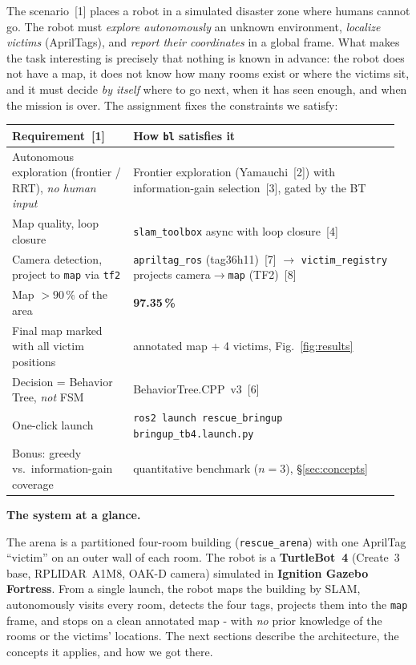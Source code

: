 \documentclass[11pt,a4paper]{article}
\newcommand{\head}[1]{\par\smallskip\noindent\textbf{\color{nccblue}#1}\par}
\begin{document}
The scenario~[1] places a robot in a simulated disaster zone where humans cannot go. The robot
must \emph{explore autonomously} an unknown environment, \emph{localize victims} (AprilTags), and
\emph{report their coordinates} in a global frame. What makes the task interesting is precisely that
nothing is known in advance: the robot does not have a map, it does not know how many rooms exist or
where the victims sit, and it must decide \emph{by itself} where to go next, when it has seen enough,
and when the mission is over. The assignment fixes the constraints we satisfy:

\smallskip
{\footnotesize
\begin{tabular}{@{}p{0.30\linewidth}p{0.66\linewidth}@{}}
\toprule
\textbf{Requirement~[1]} & \textbf{How \texttt{bl} satisfies it}\\
\midrule
Autonomous exploration (frontier / RRT), \emph{no human input} & Frontier exploration (Yamauchi~[2]) with information-gain selection~[3], gated by the BT\\
Map quality, loop closure & \texttt{slam\_toolbox} async with loop closure~[4]\\
Camera detection, project to \texttt{map} via \texttt{tf2} & \texttt{apriltag\_ros} (tag36h11)~[7] $\to$ \texttt{victim\_registry} projects camera$\to$\texttt{map} (TF2)~[8]\\
Map $>90\,\%$ of the area & \textbf{97.35\,\%}\\
Final map marked with all victim positions & annotated map + 4 victims, Fig.~\ref{fig:results}\\
Decision = Behavior Tree, \emph{not} FSM & BehaviorTree.CPP~v3~[6]\\
One-click launch & \texttt{ros2 launch rescue\_bringup bringup\_tb4.launch.py}\\
Bonus: greedy vs.\ information-gain coverage & quantitative benchmark ($n{=}3$), \S\ref{sec:concepts}\\
\bottomrule
\end{tabular}}

\head{The system at a glance.} The arena is a partitioned four-room building (\texttt{rescue\_arena})
with one AprilTag ``victim'' on an outer wall of each room. The robot is a \textbf{TurtleBot~4} (Create~3
base, RPLIDAR~A1M8, OAK-D camera) simulated in \textbf{Ignition Gazebo Fortress}. From a single launch,
the robot maps the building by SLAM, autonomously visits every room, detects the four tags, projects
them into the \texttt{map} frame, and stops on a clean annotated map - with \emph{no} prior knowledge
of the rooms or the victims' locations. The next sections describe the architecture, the concepts it applies, and how we got there.
\end{document}
